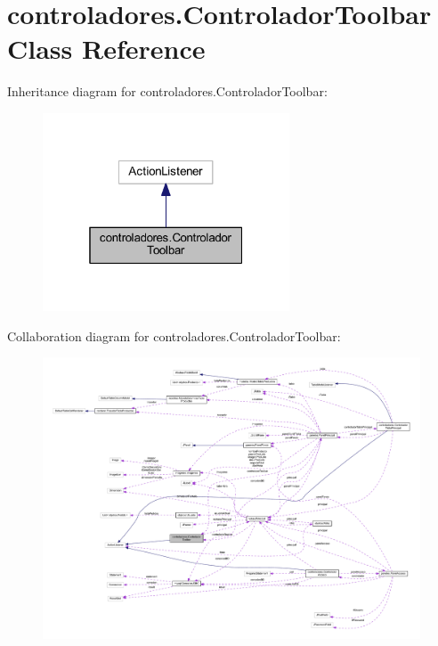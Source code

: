 \hypertarget{classcontroladores_1_1_controlador_toolbar}{}\section{controladores.\+Controlador\+Toolbar Class Reference}
\label{classcontroladores_1_1_controlador_toolbar}


Inheritance diagram for controladores.\+Controlador\+Toolbar\+:\nopagebreak
\begin{figure}[H]
\begin{center}
\leavevmode
\includegraphics[width=208pt]{classcontroladores_1_1_controlador_toolbar__inherit__graph}
\end{center}
\end{figure}


Collaboration diagram for controladores.\+Controlador\+Toolbar\+:\nopagebreak
\begin{figure}[H]
\begin{center}
\leavevmode
\includegraphics[width=350pt]{classcontroladores_1_1_controlador_toolbar__coll__graph}
\end{center}
\end{figure}
